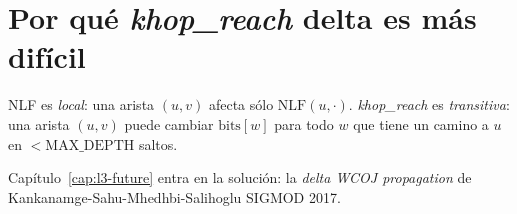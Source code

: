 \section{Por qué \emph{khop\_reach} delta es más difícil}

NLF es \emph{local}: una arista \((u, v)\) afecta sólo
\(\mathrm{NLF}(u, \cdot)\). \emph{khop\_reach} es \emph{transitiva}:
una arista \((u, v)\) puede cambiar
\(\mathrm{bits}[w]\) para todo \(w\) que tiene un camino a \(u\) en
\(< \mathrm{MAX\_DEPTH}\) saltos.

Capítulo~\ref{cap:l3-future} entra en la solución: la
\emph{delta WCOJ propagation} de Kankanamge-Sahu-Mhedhbi-Salihoglu
SIGMOD 2017.
